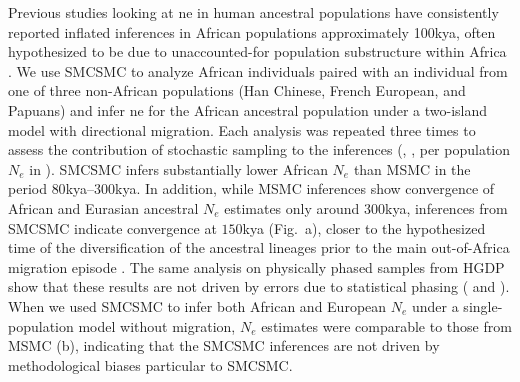 Previous studies looking at \gls{ne} in human ancestral populations have consistently reported inflated inferences in African populations approximately 100kya, often hypothesized to be due to unaccounted-for population substructure within Africa \cite{Li2011,Schiffels2014}. We use SMCSMC to analyze African individuals paired with an individual from one of three non-African populations (Han Chinese, French European, and Papuans) and infer \gls{ne} for the African ancestral population under a two-island model with directional migration.  Each analysis was repeated three times to assess the contribution of stochastic sampling to the inferences (, , per population $N_e$ in ). SMCSMC infers substantially lower African $N_e$ than MSMC in the period $80$kya--$300$kya.  In addition, while MSMC inferences show convergence of African and Eurasian ancestral $N_e$ estimates only around $300$kya, inferences from SMCSMC indicate convergence at $150$kya (Fig.\ a), closer to the hypothesized time of the diversification of the ancestral lineages prior to the main out-of-Africa migration episode \cite{Timmermann2016, Malaspinas2016}. The same analysis on physically phased samples from HGDP show that these results are not driven by errors due to statistical phasing ( and ). When we used SMCSMC to infer both African and European $N_e$ under a single-population model without migration, $N_e$ estimates were comparable to those from MSMC (b), indicating that the SMCSMC inferences are not driven by methodological biases particular to SMCSMC.

